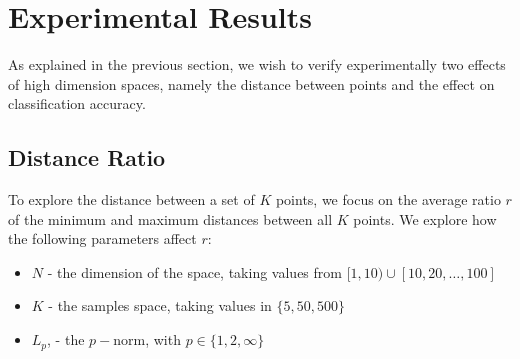 \documentclass{article}
\begin{document}
\section{Experimental Results}
As explained in the previous section, we wish to verify experimentally two effects of high dimension spaces, namely the distance between points and the effect on classification accuracy. 
\subsection{Distance Ratio}
To explore the distance between a set of $K$ points, we focus on the average ratio $r$ of the minimum and maximum distances between all $K$ points. We explore how the following parameters affect $r$:
\begin{itemize}
\item $N$ - the dimension of the space, taking values from $[1,10)\cup[10,20,\ldots,100]$
\item $K$ - the samples space, taking values in $\{5,50,500\}$
\item $L_p$, - the $p-$norm, with $p\in\{1,2,\infty\}$
\end{itemize}
\end{document}
